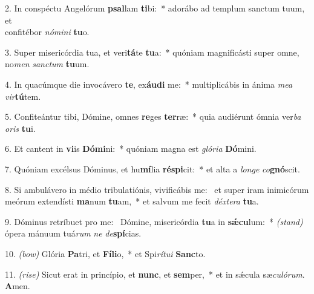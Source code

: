 	2. In conspéctu Angelórum \textbf{psal}lam \textbf{ti}bi:~* adorábo ad templum sanctum tuum, et\\ confitébor \textit{nó}\textit{mi}\textit{ni} \textbf{tu}o.

	3. Super misericórdia tua, et veri\textbf{tá}te \textbf{tu}a:~* quóniam magnificásti super omne, no\textit{men} \textit{sanc}\textit{tum} \textbf{tu}um.

	4. In quacúmque die invocávero \textbf{te}, ex\textbf{áu}\textbf{di} me:~* multiplicábis in ánima \textit{me}\textit{a} \textit{vir}\textbf{tú}tem.

	5. Confiteántur tibi, Dómine, omnes \textbf{re}ges \textbf{ter}ræ:~* quia audiérunt ómnia ver\textit{ba} \textit{o}\textit{ris} \textbf{tu}i.

	6. Et cantent in \textbf{vi}is \textbf{Dó}\textbf{mi}ni:~* quóniam magna est \textit{gló}\textit{ri}\textit{a} \textbf{Dó}mini.

	7. Quóniam excélsus Dóminus, et hu\textbf{mí}lia \textbf{ré}\textbf{spi}cit:~* et alta a \textit{lon}\textit{ge} \textit{co}\textbf{gnó}scit.

	8. Si ambulávero in médio tribulatiónis, vivificábis me:~{\color{red}\GreDagger} et super iram inimicórum meórum extendísti \textbf{ma}num \textbf{tu}am,~* et salvum me fecit \textit{déx}\textit{te}\textit{ra} \textbf{tu}a.

	9. Dóminus retríbuet pro me:~{\color{red}\GreDagger} Dómine, misericórdia \textbf{tu}a in \textbf{s\'{\ae}}\textbf{cu}lum:~* {\color{red}\textit{(stand)}} ópera mánuum tuá\textit{rum} \textit{ne} \textit{de}\textbf{spí}cias.

	10. {\color{red}\textit{(bow)}} Glória \textbf{Pa}tri, et \textbf{Fí}\textbf{li}o,~* et Spi\textit{rí}\textit{tu}\textit{i} \textbf{Sanc}to.

	11. {\color{red}\textit{(rise)}} Sicut erat in princípio, et \textbf{nunc}, et \textbf{sem}per,~* et in s\'{\ae}cula sæ\textit{cu}\textit{ló}\textit{rum}. \textbf{A}men.